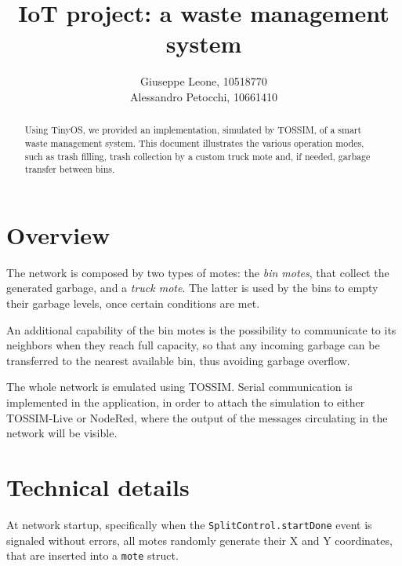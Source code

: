 \documentclass[a4paper,10pt]{article}
\title{IoT project: a waste management system}
\author{Giuseppe Leone, 10518770 \\ Alessandro Petocchi, 10661410}
\date{}
\begin{document}
\maketitle
\begin{abstract}
	\noindent Using TinyOS, we provided an implementation, simulated by TOSSIM, of a smart waste management system. This document illustrates the various operation modes, such as trash filling, trash collection by a custom truck mote and, if needed, garbage transfer between bins. 
\end{abstract}

\section{Overview}
The network is composed by two types of motes: the \textit{bin motes}, that collect the generated garbage, and a \textit{truck mote}. The latter is used by the bins to empty their garbage levels, once certain conditions are met.

\noindent An additional capability of the bin motes is the possibility to communicate to its neighbors when they reach full capacity, so that any incoming garbage can be transferred to the nearest available bin, thus avoiding garbage overflow.

\noindent The whole network is emulated using TOSSIM. Serial communication is implemented in the application, in order to attach the simulation to either TOSSIM-Live or NodeRed, where the output of the messages circulating in the network will be visible.
\section{Technical details}
At network startup, specifically when the \texttt{SplitControl.startDone} event is signaled without errors, all motes randomly generate their X and Y coordinates, that are inserted into a \texttt{mote} struct. 
\end{document}
